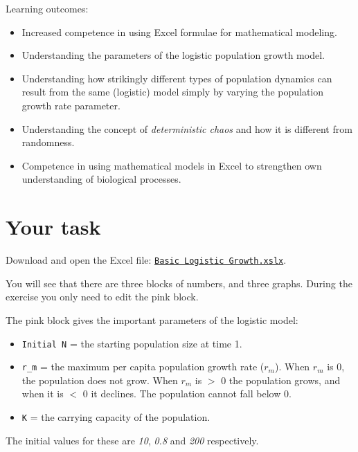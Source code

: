 \documentclass[
  a4paper]{book}
\providecommand{\tightlist}{%
  \setlength{\itemsep}{0pt}\setlength{\parskip}{0pt}}
\begin{document}
\begin{do-something}
Learning outcomes:

\begin{itemize}
\tightlist
\item
  Increased competence in using Excel formulae for mathematical
  modeling.
\item
  Understanding the parameters of the logistic population growth model.
\item
  Understanding how strikingly different types of population dynamics
  can result from the same (logistic) model simply by varying the
  population growth rate parameter.
\item
  Understanding the concept of \emph{deterministic chaos} and how it is
  different from randomness.
\item
  Competence in using mathematical models in Excel to strengthen own
  understanding of biological processes.
\end{itemize}
\end{do-something}

\hypertarget{your-task-3}{%
\section{Your task}\label{your-task-3}}

Download and open the Excel file: \href{https://www.dropbox.com/s/oxxyyn4zf4wsvkg/Basic\%20Logistic\%20Growth.xlsx?dl=1}{\texttt{Basic\ Logistic\ Growth.xslx}}.

You will see that there are three blocks of numbers, and three graphs.
During the exercise you only need to edit the pink block.

The pink block gives the important parameters of the logistic model:

\begin{itemize}
\tightlist
\item
  \texttt{Initial\ N} = the starting population size at time 1.
\item
  \texttt{r\_m} = the maximum per capita population growth rate (\(r_m\)). When \(r_m\) is 0, the population does not grow. When \(r_m\) is \(>\) 0 the population grows, and when it is \(<\) 0 it declines. The population cannot fall below 0.
\item
  \texttt{K} = the carrying capacity of the population.
\end{itemize}

The initial values for these are \emph{10}, \emph{0.8} and \emph{200} respectively.
\end{document}
